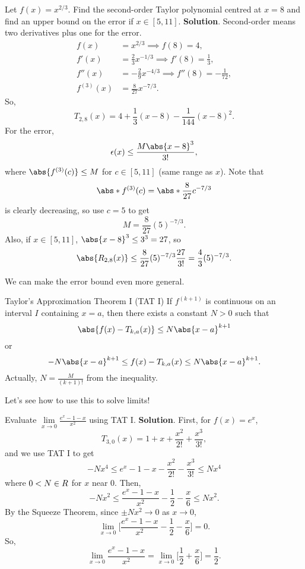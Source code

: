 \begin{Example}{}{}
    Let $ f(x)=x^{2/3} $. Find the second-order Taylor polynomial centred at $ x=8 $ and
    find an upper bound on the error if $ x\in[5,11] $.
    \tcblower{}
    \textbf{Solution}. Second-order means two derivatives plus one for the error.
    \begin{align*}
        f(x)       & =x^{2/3}\implies f(8)=4,                            \\
        f'(x)      & =\frac{2}{3}x^{-1/3}\implies f'(8)=\frac{1}{3},     \\
        f''(x)     & =-\frac{2}{9}x^{-4/3}\implies f''(8)=-\frac{1}{72}, \\
        f^{(3)}(x) & =\frac{8}{27}x^{-7/3}.
    \end{align*}
    So,
    \[ T_{2,8}(x)=4+\frac{1}{3}(x-8)-\frac{1}{144}(x-8)^2. \]
    For the error,
    \[ \epsilon(x)\le \frac{M\abs{x-8}^3}{3!}, \]
    where $ \abs{f^{(3)}(c)}\le M $ for $ c\in[5,11] $ (same range as $ x $). Note that
    \[ \abs*{f^{(3)}(c)}=\abs*{\frac{8}{27}c^{-7/3}} \]
    is clearly decreasing, so use $ c=5 $ to get
    \[ M=\frac{8}{27}(5)^{-7/3}. \]
    Also, if $ x\in[5,11] $, $ \abs{x-8}^3\le 3^3=27 $, so
    \[ \abs{R_{2,8}(x)}\le \frac{8}{27}(5)^{-7/3}\frac{27}{3!}=\frac{4}{3}(5)^{-7/3}. \]
\end{Example}
We can make the error bound even more general.
\begin{Theorem}{Taylor's Approximation Theorem I (TAT I)}{}
    If $ f^{(k+1)} $ is continuous on an interval $ I $ containing $ x=a $,
    then there exists a constant $ N>0 $ such that
    \[ \abs{f(x)-T_{k,a}(x)}\le N\abs{x-a}^{k+1} \]
    or
    \[ -N\abs{x-a}^{k+1}\le f(x)-T_{k,a}(x)\le N\abs{x-a}^{k+1}. \]
    Actually, $ N=\frac{M}{(k+1)!} $ from the inequality.
\end{Theorem}
Let's see how to use this to solve limits!
\begin{Example}{}{}
    Evaluate $ \displaystyle \lim\limits_{{x} \to {0}}\frac{e^x-1-x}{x^2} $ using TAT I\@.
    \tcblower{}
    \textbf{Solution}. First, for $ f(x)=e^x $,
    \[ T_{3,0}(x)=1+x+\frac{x^2}{2!}+\frac{x^3}{3!}, \]
    and we use TAT I to get
    \[ -Nx^4\le e^x-1-x-\frac{x^2}{2!}-\frac{x^3}{3!}\le N x^4 \]
    where $ 0<N\in\relax{R} $ for $ x $ near $ 0 $. Then,
    \[ -Nx^2\le \frac{e^x-1-x}{x^2}-\frac{1}{2}-\frac{x}{6}\le N x^2.  \]
    By the Squeeze Theorem, since $ \pm Nx^2\to 0 $ as $ x\to 0 $,
    \[ \lim\limits_{{x} \to {0}}\biggl[\frac{e^x-1-x}{x^2}-\frac{1}{2}-\frac{x}{6}\biggr]=0. \]
    So,
    \[ \lim\limits_{{x} \to {0}}\frac{e^x-1-x}{x^2}=\lim\limits_{{x} \to {0}}\biggl[\frac{1}{2}+\frac{x}{6}\biggr]=\frac{1}{2}. \]
\end{Example}
